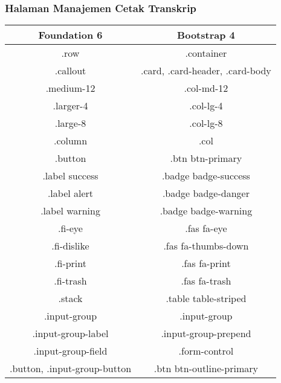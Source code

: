 \subsubsection{Halaman Manajemen Cetak Transkrip}
\begin{tabular}{|c|c|} 
	\hline
	\textbf{Foundation 6} & \textbf{Bootstrap 4}  \\ [0.5ex] 
	\hline\hline
	.row &   .container\\ 
	\hline	
	.callout &  .card, .card-header, .card-body \\
	\hline	
	.medium-12 &  .col-md-12 \\
	\hline	
	.larger-4 &  .col-lg-4 \\
	\hline
	.large-8 &  .col-lg-8 \\
	\hline
	.column &  .col \\	
	\hline	
	.button &  .btn btn-primary\\
	\hline	
	.label success &  .badge badge-success \\
	\hline	
	.label alert & .badge badge-danger  \\
	\hline	
	.label warning & .badge badge-warning  \\
	\hline	
	.fi-eye &  .fas fa-eye \\	
	\hline	
	.fi-dislike &  .fas fa-thumbs-down \\
	\hline	
	.fi-print &  .fas fa-print \\
	\hline	
	.fi-trash &  .fas fa-trash \\
	\hline	
	.stack & .table table-striped  \\
	\hline	
	 .input-group & .input-group  \\ 
	 \hline	
	 .input-group-label & .input-group-prepend  \\ 
	 \hline	
	 .input-group-field& .form-control  \\ 
	 \hline	
	 .button, .input-group-button& .btn btn-outline-primary  \\ [1ex] 
	\hline
\end{tabular}



